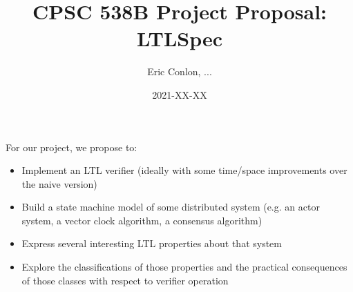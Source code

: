 \documentclass[12pt, letterpaper, twoside]{article}
\title{CPSC 538B Project Proposal: LTLSpec}
\author{Eric Conlon, ...}
\date{2021-XX-XX}
\begin{document}

\maketitle

For our project, we propose to:

\begin{itemize}
  \item Implement an LTL verifier (ideally with some time/space improvements over the naive version)
  \item Build a state machine model of some distributed system (e.g. an actor system, a vector clock algorithm, a consensus algorithm)
  \item Express several interesting LTL properties about that system
  \item Explore the classifications of those properties and the practical consequences of those classes with respect to verifier operation
\end{itemize}
\end{document}
